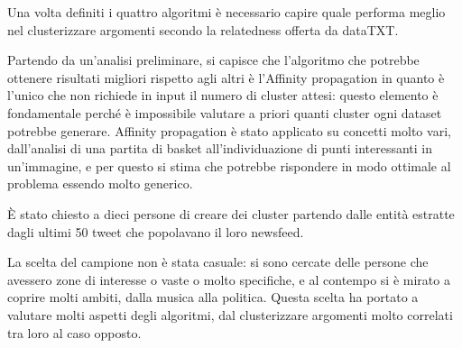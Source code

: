 Una volta definiti i quattro algoritmi è necessario capire quale performa meglio nel clusterizzare argomenti secondo la relatedness offerta da dataTXT.

Partendo da un'analisi preliminare, si capisce che l'algoritmo che potrebbe ottenere risultati migliori rispetto agli altri è l'Affinity propagation in quanto è l'unico che non richiede in input il numero di cluster attesi: questo elemento è fondamentale perché è impossibile valutare a priori quanti cluster ogni dataset potrebbe generare. 
Affinity propagation è stato applicato su concetti molto vari, dall'analisi di una partita di basket all'individuazione di punti interessanti in un'immagine, e per questo si stima che potrebbe rispondere in modo ottimale al problema essendo molto generico.

È stato chiesto a dieci persone di creare dei cluster partendo dalle entità estratte dagli ultimi 50 tweet che popolavano il loro newsfeed.

La scelta del campione non è stata casuale: si sono cercate delle persone che avessero zone di interesse o vaste o molto specifiche, e al contempo si è mirato a coprire molti ambiti, dalla musica alla politica. Questa scelta ha portato a valutare molti aspetti degli algoritmi, dal clusterizzare argomenti molto correlati tra loro al caso opposto. 

